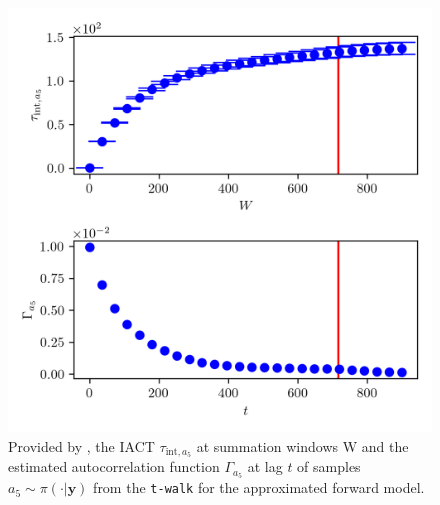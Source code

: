 \begin{figure}[ht!]
	\centering
	\includegraphics{UwerrTauIntTWalk15.png}
	\caption[IACT and autocorrelation function of samples $a_5 \sim \pi(\cdot|\bm{y})$, for approximated model.]{Provided by \cite{drikHesse}, the IACT $\tau_{\text{int},a_5}$ at summation windows W and the estimated autocorrelation function $\Gamma_{a_5}$ at lag $t$ of samples $a_5 \sim \pi(\cdot| \bm{y})$ from the \texttt{t-walk} for the approximated forward model.}
	\label{fig:TWalkIATC16}
\end{figure}

